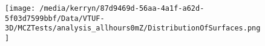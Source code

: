 \documentclass{article}
\begin{document}
\begin{figure}           %
\centering    
\texttt{[image: /media/kerryn/87d9469d-56aa-4a1f-a62d-5f03d7599bbf/Data/VTUF-3D/MCZTests/analysis\_allhours0mZ/DistributionOfSurfaces.png]}
\end{figure} 
\clearpage



\end{document}
